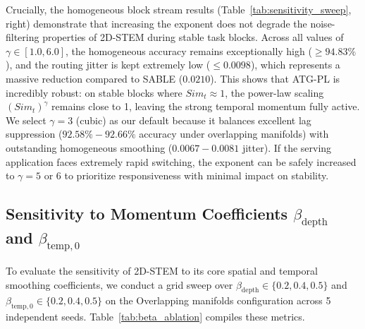Crucially, the homogeneous block stream results (Table~\ref{tab:sensitivity_sweep}, right) demonstrate that increasing the exponent does not degrade the noise-filtering properties of 2D-STEM during stable task blocks. Across all values of $\gamma \in [1.0, 6.0]$, the homogeneous accuracy remains exceptionally high ($\ge 94.83\%$), and the routing jitter is kept extremely low ($\le 0.0098$), which represents a massive reduction compared to SABLE ($0.0210$). This shows that ATG-PL is incredibly robust: on stable blocks where $Sim_t \approx 1$, the power-law scaling $(Sim_t)^\gamma$ remains close to 1, leaving the strong temporal momentum fully active. We select $\gamma = 3$ (cubic) as our default because it balances excellent lag suppression ($92.58\% - 92.66\%$ accuracy under overlapping manifolds) with outstanding homogeneous smoothing ($0.0067 - 0.0081$ jitter). If the serving application faces extremely rapid switching, the exponent can be safely increased to $\gamma=5$ or $6$ to prioritize responsiveness with minimal impact on stability.

\subsection{Sensitivity to Momentum Coefficients $\beta_{\text{depth}}$ and $\beta_{\text{temp}, 0}$}
To evaluate the sensitivity of 2D-STEM to its core spatial and temporal smoothing coefficients, we conduct a grid sweep over $\beta_{\text{depth}} \in \{0.2, 0.4, 0.5\}$ and $\beta_{\text{temp}, 0} \in \{0.2, 0.4, 0.5\}$ on the Overlapping manifolds configuration across 5 independent seeds. Table~\ref{tab:beta_ablation} compiles these metrics.


